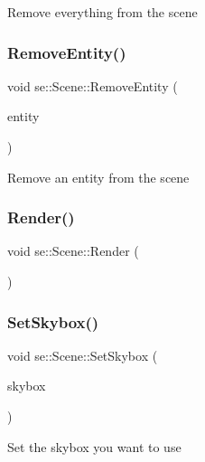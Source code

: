 Remove everything from the scene \mbox{\label{classse_1_1_scene_a5803cfd0f0dccf350f7a3fe478b3c834}} 
\subsubsection{\texorpdfstring{Remove\+Entity()}{RemoveEntity()}}
{\footnotesize\ttfamily void se\+::\+Scene\+::\+Remove\+Entity (\begin{DoxyParamCaption}\item[{\mbox{\hyperlink{classse_1_1_entity}{Entity}} $\ast$}]{entity }\end{DoxyParamCaption})}

Remove an entity from the scene \mbox{\label{classse_1_1_scene_a6631ed2e0cc029636464dbaf76d55cbf}} 
\subsubsection{\texorpdfstring{Render()}{Render()}}
{\footnotesize\ttfamily void se\+::\+Scene\+::\+Render (\begin{DoxyParamCaption}{ }\end{DoxyParamCaption})}

\mbox{\label{classse_1_1_scene_a3e6547c6013dc83a23d6cc0f349955f0}} 
\subsubsection{\texorpdfstring{Set\+Skybox()}{SetSkybox()}}
{\footnotesize\ttfamily void se\+::\+Scene\+::\+Set\+Skybox (\begin{DoxyParamCaption}\item[{\mbox{\hyperlink{classse_1_1_abstract_skybox}{Abstract\+Skybox}} $\ast$}]{skybox }\end{DoxyParamCaption})}

Set the skybox you want to use \mbox{\label{classse_1_1_scene_a75e3a3401c9d999f43baf01e89b16735}} 

